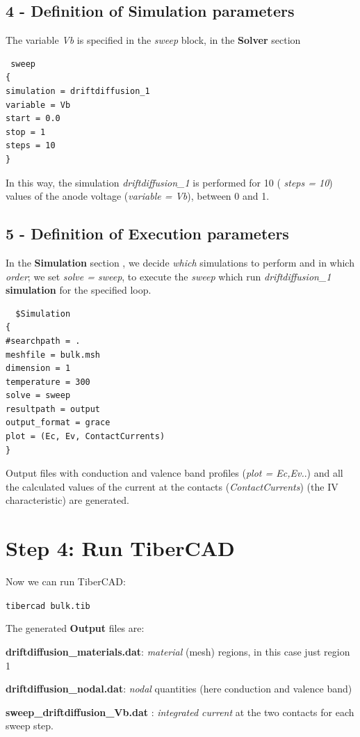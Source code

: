 \subsection* {4 - Definition of Simulation parameters}

The variable \textit{Vb }is specified in the \textit{sweep} block, in the \textbf{Solver} section
\begin{verbatim}
 sweep
{
simulation = driftdiffusion_1
variable = Vb
start = 0.0
stop = 1
steps = 10
}
\end{verbatim}

In this way, the simulation \textit{driftdiffusion\_1} is performed for 10 ( \textit{steps = 10}) values of the anode voltage (\textit{variable = Vb}), between 0 and 1.

\subsection* {5 - Definition of Execution parameters}
In the \textbf{Simulation} section , we decide \textit{which} simulations to perform and in which \textit{order}; we set
\textit{solve = sweep}, to execute the \textit{sweep} which run \textit{driftdiffusion\_1} \textbf{simulation} for the specified loop.
\begin{verbatim}
  $Simulation
{
#searchpath = .
meshfile = bulk.msh
dimension = 1
temperature = 300
solve = sweep
resultpath = output
output_format = grace
plot = (Ec, Ev, ContactCurrents)
}
\end{verbatim}
Output files with conduction and valence band profiles (\textit{plot = Ec,Ev.}.) and all the calculated values of the current at the contacts (\textit{ContactCurrents}) (the IV characteristic) are generated.



\section*{Step 4: Run TiberCAD{}}

Now we can run TiberCAD{}:

\texttt{tibercad  bulk.tib}


\vspace{0.5cm}
The generated \textbf{Output} files are:



\textbf{driftdiffusion\_materials.dat}: \textit{material} (mesh) regions, in this case just region 1

\textbf{driftdiffusion\_nodal.dat}: \textit{nodal} quantities (here conduction and valence band)

\textbf{sweep\_driftdiffusion\_Vb.dat} : \textit{integrated current} at the two contacts for each sweep step.














